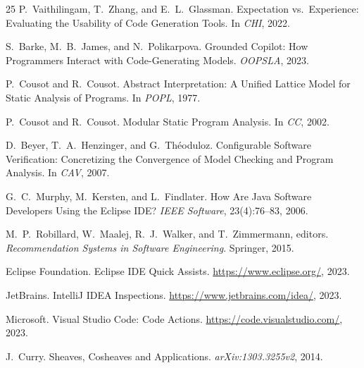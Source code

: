 \documentclass[11pt]{article}
\begin{document}
\begin{thebibliography}{25}
P.~Vaithilingam, T.~Zhang, and E.~L.~Glassman.
\newblock Expectation vs.\ Experience: Evaluating the Usability of Code
  Generation Tools.
\newblock In \emph{CHI}, 2022.

S.~Barke, M.~B.~James, and N.~Polikarpova.
\newblock Grounded Copilot: How Programmers Interact with Code-Generating
  Models.
\newblock \emph{OOPSLA}, 2023.

P.~Cousot and R.~Cousot.
\newblock Abstract Interpretation: A Unified Lattice Model for Static Analysis
  of Programs.
\newblock In \emph{POPL}, 1977.

P.~Cousot and R.~Cousot.
\newblock Modular Static Program Analysis.
\newblock In \emph{CC}, 2002.

D.~Beyer, T.~A.~Henzinger, and G.~Th{\'e}oduloz.
\newblock Configurable Software Verification: Concretizing the Convergence of
  Model Checking and Program Analysis.
\newblock In \emph{CAV}, 2007.

G.~C.~Murphy, M.~Kersten, and L.~Findlater.
\newblock How Are Java Software Developers Using the Eclipse IDE?
\newblock \emph{IEEE Software}, 23(4):76--83, 2006.

M.~P.~Robillard, W.~Maalej, R.~J.~Walker, and T.~Zimmermann, editors.
\newblock \emph{Recommendation Systems in Software Engineering}.
\newblock Springer, 2015.

Eclipse Foundation.
\newblock Eclipse IDE Quick Assists.
\newblock \url{https://www.eclipse.org/}, 2023.

JetBrains.
\newblock IntelliJ IDEA Inspections.
\newblock \url{https://www.jetbrains.com/idea/}, 2023.

Microsoft.
\newblock Visual Studio Code: Code Actions.
\newblock \url{https://code.visualstudio.com/}, 2023.

J.~Curry.
\newblock Sheaves, Cosheaves and Applications.
\newblock \emph{arXiv:1303.3255v2}, 2014.

\end{thebibliography}
\end{document}
